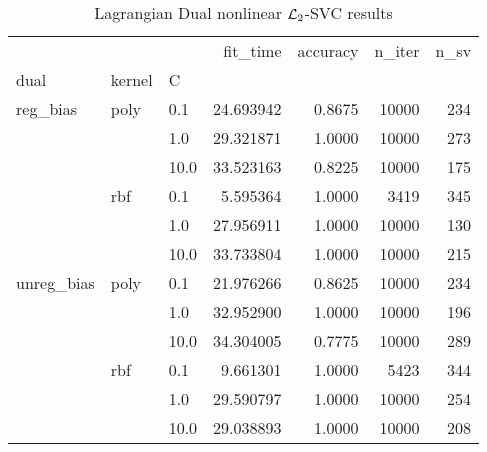 \begin{table}[H]
\centering
\caption{Lagrangian Dual nonlinear $\protect \mathcal{L}_2$-SVC results}
\label{nonlinear_lagrangian_dual_l2_svc_cv_results}
\begin{tabular}{lllrrrr}
\toprule
           &     &      &   fit\_time &  accuracy &  n\_iter &  n\_sv \\
dual & kernel & C &            &           &         &       \\
\midrule
reg\_bias & poly & 0.1  &  24.693942 &    0.8675 &   10000 &   234 \\
           &     & 1.0  &  29.321871 &    1.0000 &   10000 &   273 \\
           &     & 10.0 &  33.523163 &    0.8225 &   10000 &   175 \\
           & rbf & 0.1  &   5.595364 &    1.0000 &    3419 &   345 \\
           &     & 1.0  &  27.956911 &    1.0000 &   10000 &   130 \\
           &     & 10.0 &  33.733804 &    1.0000 &   10000 &   215 \\
unreg\_bias & poly & 0.1  &  21.976266 &    0.8625 &   10000 &   234 \\
           &     & 1.0  &  32.952900 &    1.0000 &   10000 &   196 \\
           &     & 10.0 &  34.304005 &    0.7775 &   10000 &   289 \\
           & rbf & 0.1  &   9.661301 &    1.0000 &    5423 &   344 \\
           &     & 1.0  &  29.590797 &    1.0000 &   10000 &   254 \\
           &     & 10.0 &  29.038893 &    1.0000 &   10000 &   208 \\
\bottomrule
\end{tabular}
\end{table}

